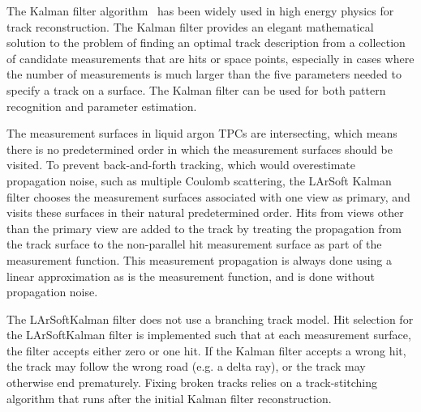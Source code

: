\documentclass[12pt]{elsarticle}
\newcommand{\larsoft}{LArSoft}
\begin{document}
The Kalman filter algorithm~\cite{kalman} has been widely used in high
energy physics for track reconstruction. The Kalman
filter provides an elegant mathematical solution to the problem of
finding an optimal track description from a collection of candidate
measurements that are hits or space points, especially in cases where the
number of measurements is much larger than the five parameters
needed to specify a track on a surface.  The Kalman
filter can be used for both pattern recognition and parameter
estimation.  

The measurement surfaces in liquid argon TPCs are intersecting, which means there is no
predetermined order in which the measurement surfaces should be
visited.  To prevent back-and-forth tracking, which would overestimate
propagation noise, such as multiple Coulomb scattering, the \larsoft
Kalman filter chooses the measurement surfaces associated with one
view as primary, and visits these surfaces in their natural
predetermined order.  Hits from views other than the primary view are
added to the track by treating the propagation from the track surface
to the non-parallel hit measurement surface as part of the measurement
function.  This measurement propagation is always done using a linear
approximation as is the measurement function, and is done without
propagation noise.

The \larsoft Kalman filter
does not use a branching track model. Hit selection for the \larsoft Kalman filter is
implemented such that at each measurement surface, the filter accepts
either zero or one hit. If the Kalman filter accepts a wrong hit, the
track may follow the wrong road (e.g. a delta ray), or the track may
otherwise end prematurely.  Fixing broken tracks relies on
a track-stitching algorithm that runs after the initial Kalman
filter reconstruction.
\end{document}
